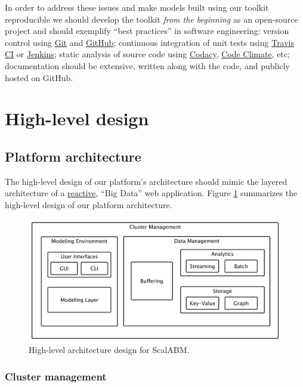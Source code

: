 \documentclass[11pt]{amsart}
\begin{document}
In order to address these issues and make models built using our toolkit reproducible we should develop the toolkit \textit{from the beginning} as an open-source project and should exemplify ``best practices'' in software engineering: version control using \href{https://git-scm.com/}{Git} and \href{https://github.com/}{GitHub}; continuous integration of unit tests using \href{https://travis-ci.org/}{Travis CI} or \href{https://jenkins-ci.org/}{Jenkins}; static analysis of source code using \href{https://www.codacy.com/login}{Codacy}, \href{https://codeclimate.com/}{Code Climate}, etc; documentation should be extensive, written along with the code, and publicly hosted on GitHub.   
    
\section{High-level design}

\subsection{Platform architecture}
The high-level design of our platform's architecture should mimic the layered architecture of a \href{http://www.reactivemanifesto.org/}{reactive}, ``Big Data'' web application. Figure \ref{img-figure1} summarizes the high-level design of our platform architecture.
\begin{figure}[H]\label{img-figure1}
\centering
\includegraphics[width=12cm]{img/coarse-grain-schema.pdf}
\caption{High-level architecture design for ScalABM.}
\end{figure}

\subsubsection{Cluster management}
\end{document}

